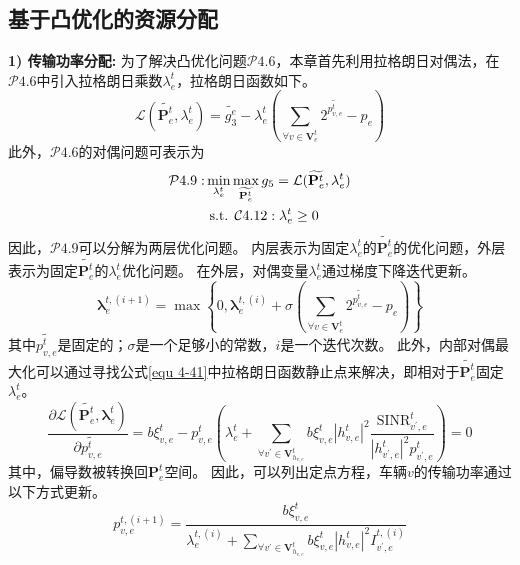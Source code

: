 \subsection{基于凸优化的资源分配}
\textbf{1) 传输功率分配:} 为了解决凸优化问题$\mathcal{P}4.6$，本章首先利用拉格朗日对偶法\cite{boyd2004convex}，在$\mathcal{P}4.6$中引入拉格朗日乘数$\lambda_{e}^{t}$，拉格朗日函数如下。
\begin{equation}
	\mathcal{L}(\widetilde{\mathbf{{P}}_{e}^{t}}, {\lambda}_{e}^{t} ) = \widetilde{g_3^{e}} -  {\lambda}_{e}^{t} (\sum_{\forall v \in \mathbf{V}_{e}^{t}} 2^{\widetilde{p_{v, e}^{t}}} - p_{e} )
	\label{equ 4-41}
\end{equation}
此外，$\mathcal{P}4.6$的对偶问题可表示为
\begin{align}
	\mathcal{P}4.9: & \min_{{\lambda}_{e}^{t}} \max_{\widetilde{\mathbf{{P}}_{e}^{t}}}  g_5 = \mathcal{L}(\widetilde{\mathbf{{P}}_{e}^{t}}, {\lambda}_{e}^{t} ) \notag \\
	&\text { s.t. } \mathcal{C}4.12: \mathbf{\lambda}_{e}^{t} \geq 0  
\end{align}
因此，$\mathcal{P}4.9$可以分解为两层优化问题。
内层表示为固定${\lambda}_{e}^{t}$的$\widetilde{\mathbf{{P}}_{e}^{t}}$的优化问题，外层表示为固定$\widetilde{\mathbf{{P}}_{e}^{t}}$的${\lambda}_{e}^{t}$优化问题。
在外层，对偶变量${\lambda}_{e}^{t}$通过梯度下降迭代更新。
\begin{equation}
	\mathbf{\lambda}_{e}^{t, (i+1)} = \max\left\{0, \mathbf{\lambda}_{e}^{t, (i)} + \sigma (\sum_{\forall v \in \mathbf{V}_{e}^{t}} 2^{\widetilde{p_{v, e}^{t}}} - p_{e} )\right\}
\end{equation}
其中$\widetilde{p_{v, e}^{t}}$是固定的；$\sigma$是一个足够小的常数，$i$是一个迭代次数。
此外，内部对偶最大化可以通过寻找公式\ref{equ 4-41}中拉格朗日函数静止点来解决，即相对于$\widetilde{\mathbf{{P}}_{e}^{t}}$固定${\lambda}_{e}^{t}$。
\begin{equation}
\frac{\partial \mathcal{L}\left(\widetilde{\mathbf{{P}}_{e}^{t}}, \mathbf{\lambda}_{e}^{t} \right)}{\partial \widetilde{p_{v, e}^{t}}}= b  \xi_{v, e}^{t}  - p_{v, e}^{t}(\lambda_{e}^{t} +\sum\limits_{\forall v^{\prime} \in \mathbf{V}_{h_{v, e}}^{t}} b  \xi_{v, e}^{t} |h_{v, e}^t|^2 \frac{\mathrm{SINR}_{v^{\prime}, e}^t}{|h_{v^{\prime}, e}^t| ^{2} p_{v^{\prime}, e}^{t}}) =0
\end{equation}
其中，偏导数被转换回$\mathbf{P}_{e}^{t}$空间。
因此，可以列出定点方程，车辆$v$的传输功率通过以下方式更新。
\begin{equation}
p_{v, e}^{t, {(i+1)}}=\frac{b \xi_{v, e}^{t}}{\lambda_{e}^{t,(i)}+\sum\limits_{\forall v^{\prime} \in \mathbf{V}_{h_{v, e}}^{t}} b  \xi_{v, e}^{t}|h_{v, e}^t|^2 {I}_{v^{\prime}, e}^{t, (i)} }
\end{equation}
